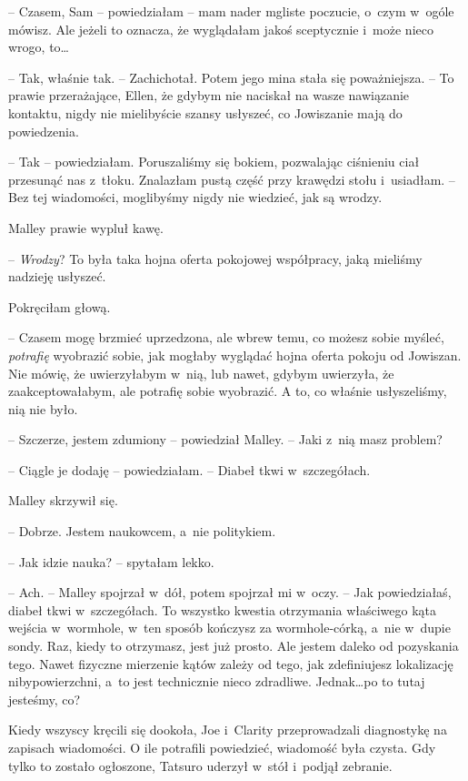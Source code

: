 \documentclass[oneside,polish,11pt,sfheadings]{mwbk}
\begin{document}
-- Czasem, Sam -- powiedziałam -- mam nader mgliste poczucie, o~czym w~ogóle mówisz. Ale jeżeli to oznacza, że wyglądałam jakoś sceptycznie i~może nieco wrogo, to\ldots 

-- Tak, właśnie tak. -- Zachichotał. Potem jego mina stała się
poważniejsza. -- To prawie przerażające, Ellen, że gdybym nie naciskał na
wasze nawiązanie kontaktu, nigdy nie mielibyście szansy usłyszeć, co
Jowiszanie mają do powiedzenia.

-- Tak -- powiedziałam. Poruszaliśmy się bokiem, pozwalając ciśnieniu ciał
przesunąć nas z~tłoku. Znalazłam pustą część przy krawędzi stołu i~usiadłam. -- Bez tej wiadomości, moglibyśmy nigdy nie wiedzieć, jak są
wrodzy.

Malley prawie wypluł kawę. 

-- \textit{Wrodzy}? To była taka hojna oferta
pokojowej współpracy, jaką mieliśmy nadzieję usłyszeć.

Pokręciłam głową. 

-- Czasem mogę brzmieć uprzedzona, ale wbrew temu, co
możesz sobie myśleć, \textit{potrafię} wyobrazić sobie, jak mogłaby
wyglądać hojna oferta pokoju od Jowiszan. Nie mówię, że uwierzyłabym w~nią, lub nawet, gdybym uwierzyła, że zaakceptowałabym, ale potrafię
sobie wyobrazić. A to, co właśnie usłyszeliśmy, nią nie było.

-- Szczerze, jestem zdumiony -- powiedział Malley. -- Jaki z~nią masz
problem?

-- Ciągle je dodaję -- powiedziałam. -- Diabeł tkwi w~szczegółach.

Malley skrzywił się. 

-- Dobrze. Jestem naukowcem, a~nie politykiem.

-- Jak idzie nauka? -- spytałam lekko.

-- Ach. -- Malley spojrzał w~dół, potem spojrzał mi w~oczy. -- Jak
powiedziałaś, diabeł tkwi w~szczegółach. To wszystko kwestia otrzymania
właściwego kąta wejścia w~wormhole, w~ten sposób kończysz za
wormhole-córką, a~nie w~dupie sondy. Raz, kiedy to otrzymasz, jest już
prosto. Ale jestem daleko od pozyskania tego. Nawet fizyczne mierzenie
kątów zależy od tego, jak zdefiniujesz lokalizację nibypowierzchni, a~to
jest technicznie nieco zdradliwe. Jednak\ldots  po to tutaj jesteśmy, co?

Kiedy wszyscy kręcili się dookoła, Joe i~Clarity przeprowadzali
diagnostykę na zapisach wiadomości. O ile potrafili powiedzieć,
wiadomość była czysta. Gdy tylko to zostało ogłoszone, Tatsuro uderzył w~stół i~podjął zebranie.
\end{document}
